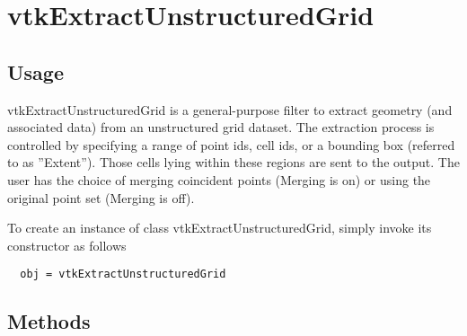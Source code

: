 \section{vtkExtractUnstructuredGrid}

\subsection{Usage}

 vtkExtractUnstructuredGrid is a general-purpose filter to
 extract geometry (and associated data) from an unstructured grid
 dataset. The extraction process is controlled by specifying a range
 of point ids, cell ids, or a bounding box (referred to as ''Extent'').
 Those cells lying within these regions are sent to the output.
 The user has the choice of merging coincident points (Merging is on)
 or using the original point set (Merging is off).

To create an instance of class vtkExtractUnstructuredGrid, simply
invoke its constructor as follows
\begin{verbatim}
  obj = vtkExtractUnstructuredGrid
\end{verbatim}
\subsection{Methods}

